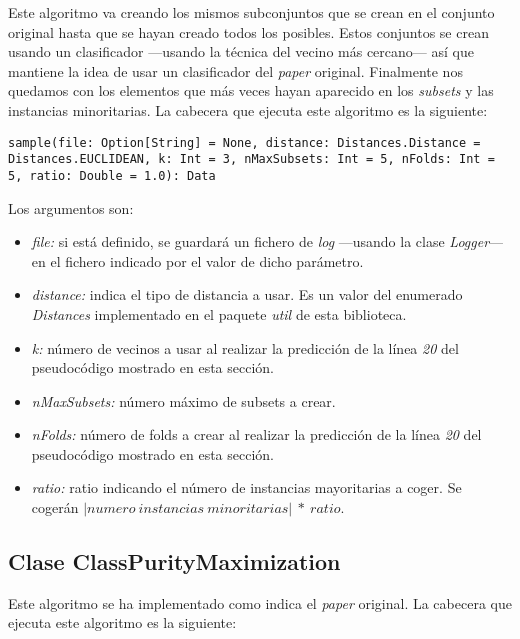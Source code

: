 Este algoritmo va creando los mismos subconjuntos que se crean en el conjunto original hasta que se hayan creado todos los posibles. Estos conjuntos se crean usando un clasificador —usando la técnica del vecino más cercano— así que mantiene la idea de usar un clasificador del \textit{paper} original. Finalmente nos quedamos con los elementos que más veces hayan aparecido en los \textit{subsets} y las instancias minoritarias. La cabecera que ejecuta este algoritmo es la siguiente:

\begin{lstlisting}[frame=single, basicstyle=\scriptsize, breaklines=true]
sample(file: Option[String] = None, distance: Distances.Distance = Distances.EUCLIDEAN, k: Int = 3, nMaxSubsets: Int = 5, nFolds: Int = 5, ratio: Double = 1.0): Data
\end{lstlisting}

Los argumentos son:

\begin{itemize}
    \item \textit{file:} si está definido, se guardará un fichero de \textit{log} —usando la clase \textit{Logger}— en el fichero indicado por el valor de dicho parámetro.
    \item \textit{distance:} indica el tipo de distancia a usar. Es un valor del enumerado \textit{Distances} implementado en el paquete \textit{util} de esta biblioteca.
    \item \textit{k:} número de vecinos a usar al realizar la predicción de la línea \textit{20} del pseudocódigo mostrado en esta sección.
    \item \textit{nMaxSubsets:} número máximo de subsets a crear.
    \item \textit{nFolds:} número de folds a crear al realizar la predicción de la línea \textit{20} del pseudocódigo mostrado en esta sección.
    \item \textit{ratio:} ratio indicando el número de instancias mayoritarias a coger. Se cogerán $\left | numero\ instancias\ minoritarias \right | \ *\ ratio$.
\end{itemize}

\subsection{Clase ClassPurityMaximization} \label{subsec:impl_classpuritymaximization}

Este algoritmo se ha implementado como indica el \textit{paper} original. La cabecera que ejecuta este algoritmo es la siguiente:

